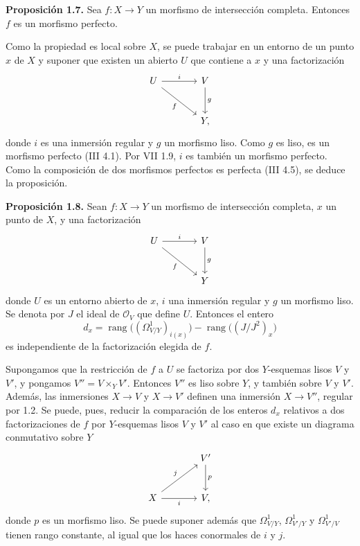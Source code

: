\textbf{Proposición 1.7.} Sea $f:X\to Y$ un morfismo de intersección
completa. Entonces $f$ es un morfismo perfecto.

Como la propiedad es local sobre $X$, se puede trabajar en un entorno de un
punto $x$ de $X$ y suponer que existen un abierto $U$ que contiene a $x$ y
una factorización
\[
\begin{tikzcd}[column sep=large,row sep=large]
U \arrow[r,"i"] \arrow[dr,"f"'] & V \arrow[d,"g"]\\
& Y,
\end{tikzcd}
\]
donde $i$ es una inmersión regular y $g$ un morfismo liso. Como $g$ es liso,
es un morfismo perfecto (III 4.1). Por VII 1.9, $i$ es también un morfismo
perfecto. Como la composición de dos morfismos perfectos es perfecta (III
4.5), se deduce la proposición.

\textbf{Proposición 1.8.} Sean $f:X\to Y$ un morfismo de intersección
completa, $x$ un punto de $X$, y una factorización
\[
\begin{tikzcd}[column sep=large,row sep=large]
U \arrow[r,"i"] \arrow[dr,"f"'] & V \arrow[d,"g"]\\
& Y
\end{tikzcd}
\]
donde $U$ es un entorno abierto de $x$, $i$ una inmersión regular y $g$ un
morfismo liso. Se denota por $J$ el ideal de $\mathcal O_V$ que define $U$.
Entonces el entero
\[
d_x=\operatorname{rang}\bigl((\Omega^1_{V/Y})_{i(x)}\bigr)-\operatorname{rang}\bigl((J/J^2)_x\bigr)
\]
es independiente de la factorización elegida de $f$.

Supongamos que la restricción de $f$ a $U$ se factoriza por dos $Y$-esquemas
lisos $V$ y $V'$, y pongamos $V''=V\times_Y V'$. Entonces $V''$ es liso sobre
$Y$, y también sobre $V$ y $V'$. Además, las inmersiones $X\to V$ y
$X\to V'$ definen una inmersión $X\to V''$, regular por 1.2. Se puede, pues,
reducir la comparación de los enteros $d_x$ relativos a dos factorizaciones
de $f$ por $Y$-esquemas lisos $V$ y $V'$ al caso en que existe un diagrama
conmutativo sobre $Y$
\[
\begin{tikzcd}[column sep=large,row sep=large]
& V' \arrow[d,"p"]\\
X \arrow[ur,"j"] \arrow[r,"i"'] & V,
\end{tikzcd}
\]
donde $p$ es un morfismo liso. Se puede suponer además que
$\Omega^1_{V/Y}$, $\Omega^1_{V'/Y}$ y $\Omega^1_{V'/V}$ tienen rango
constante, al igual que los haces conormales de $i$ y $j$.

